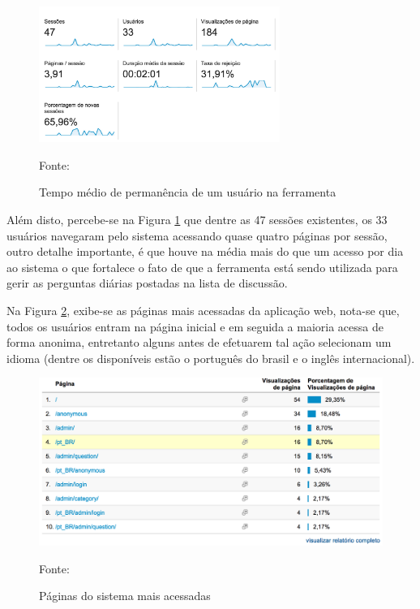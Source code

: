 \begin{figure}[h!tb]
	\caption{Tempo médio de permanência de um usuário na ferramenta}
	\label{fig:googleAnalyticsTempoAcesso}

	\centering
	\includegraphics[width=0.7\textwidth]{images/resultados/google-analytics-dados.png}

	\centering
	\footnotesize Fonte: \fonteOAutor
\end{figure}

\FloatBarrier 	%

Além disto, percebe-se na Figura \ref{fig:googleAnalyticsTempoAcesso} que dentre
as 47 sessões existentes, os 33 usuários navegaram pelo sistema acessando quase
quatro páginas por sessão, outro detalhe importante, é que houve na média mais
do que um acesso por dia ao sistema o que fortalece o fato de que a ferramenta
está sendo utilizada para gerir as perguntas diárias postadas na lista de
discussão.

Na Figura \ref{fig:googleAnalyticsPaginas}, exibe-se as páginas mais acessadas
da aplicação web, nota-se que, todos os usuários entram na página inicial e em
seguida a maioria acessa de forma anonima, entretanto alguns antes de efetuarem
tal ação selecionam um idioma (dentre os disponíveis estão o português do
brasil e o inglês internacional).

\begin{figure}[h!tb]
	\caption{Páginas do sistema mais acessadas}
	\label{fig:googleAnalyticsPaginas}

	\centering
	\includegraphics[width=\textwidth]{images/resultados/google-analytics-paginas.png}

	\centering
	\footnotesize Fonte: \fonteOAutor
\end{figure}

